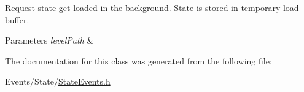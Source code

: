 Request state get loaded in the background. \hyperlink{classState}{State} is stored in temporary load buffer. 


\begin{DoxyParams}{Parameters}
{\em level\+Path} & \\
\hline
\end{DoxyParams}


The documentation for this class was generated from the following file\+:\begin{DoxyCompactItemize}
\item 
Events/\+State/\hyperlink{StateEvents_8h}{State\+Events.\+h}\end{DoxyCompactItemize}
